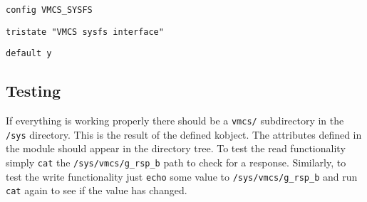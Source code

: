 \documentclass[onecolumn, draftclsnofoot,10pt, compsoc]{IEEEtran}
\begin{document}
    \texttt{config VMCS\_SYSFS}\par
    \makebox[1.5cm]{}\texttt{tristate "VMCS sysfs interface"}\par
    \makebox[1.5cm]{}\texttt{default y}
    
    \subsection{Testing}
    If everything is working properly there should be a \texttt{vmcs/} subdirectory in the \texttt{/sys} directory. This is the result of the defined kobject.
    The attributes defined in the module should appear in the directory tree.
    To test the read functionality simply \texttt{cat} the \texttt{/sys/vmcs/g\_rsp\_b} path to check for a response. Similarly, to test the write functionality just \texttt{echo} some value to \texttt{/sys/vmcs/g\_rsp\_b} and run \texttt{cat} again to see if the value has changed.
    
    \newpage
\end{document}
